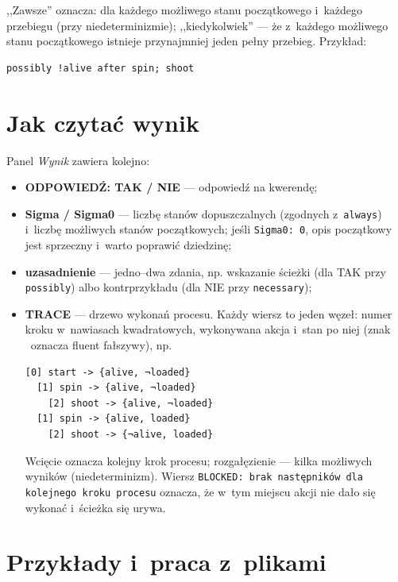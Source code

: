 \documentclass[11pt,a4paper]{article}
\begin{document}
,,Zawsze'' oznacza: dla każdego możliwego stanu początkowego i~każdego
przebiegu (przy niedeterminizmie); ,,kiedykolwiek'' --- że z~każdego
możliwego stanu początkowego istnieje przynajmniej jeden pełny przebieg.
Przykład:

\begin{verbatim}
possibly !alive after spin; shoot
\end{verbatim}

\section{Jak czytać wynik}
\label{sec:wynik}

Panel \emph{Wynik} zawiera kolejno:

\begin{itemize}
  \item \textbf{ODPOWIEDŹ: TAK / NIE} --- odpowiedź na kwerendę;
  \item \textbf{Sigma / Sigma0} --- liczbę stanów dopuszczalnych (zgodnych
        z~\texttt{always}) i~liczbę możliwych stanów początkowych; jeśli
        \texttt{Sigma0:~0}, opis początkowy jest sprzeczny i~warto poprawić
        dziedzinę;
  \item \textbf{uzasadnienie} --- jedno--dwa zdania, np. wskazanie ścieżki
        (dla TAK przy \texttt{possibly}) albo kontrprzykładu (dla NIE przy
        \texttt{necessary});
  \item \textbf{TRACE} --- drzewo wykonań procesu. Każdy wiersz to jeden
        węzeł: numer kroku w~nawiasach kwadratowych, wykonywana akcja
        i~stan po niej (znak \textlnot\ oznacza fluent fałszywy), np.
\begin{verbatim}
[0] start -> {alive, ¬loaded}
  [1] spin -> {alive, ¬loaded}
    [2] shoot -> {alive, ¬loaded}
  [1] spin -> {alive, loaded}
    [2] shoot -> {¬alive, loaded}
\end{verbatim}
        Wcięcie oznacza kolejny krok procesu; rozgałęzienie --- kilka możliwych
        wyników (niedeterminizm). Wiersz \texttt{BLOCKED: brak następników dla
        kolejnego kroku procesu} oznacza, że w~tym miejscu akcji nie dało się
        wykonać i~ścieżka się urywa.
\end{itemize}

\section{Przykłady i~praca z~plikami}
\end{document}
